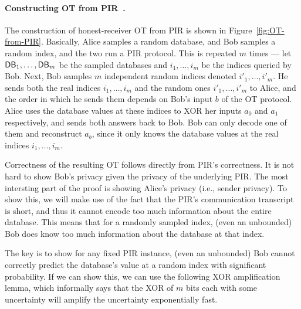 \paragraph{Constructing OT from PIR~\cite{CMO00}.}
The construction of honest-receiver OT from PIR is shown in Figure~\ref{fig:OT-from-PIR}.
Basically, Alice samples a random database, and Bob samples a random index,
and the two run a PIR protocol. This is repeated $m$ times 
--- let ${\sf DB}_1, \ldots, {\sf DB}_m$ be the sampled databases and $i_1, \ldots, i_m$ 
be the indices queried by Bob.
Next, Bob samples $m$ independent random indices denoted $i'_1, \ldots, i'_m$.
He sends both the real indices $i_1, \ldots, i_m$
and the random ones $i'_1, \ldots, i'_m$
to Alice, and the order in which 
he sends them depends on Bob's input $b$ of the OT protocol. 
Alice uses the database values at these indices
to XOR her inputs $a_0$ and $a_1$ respectively, and sends both answers back to Bob.
Bob can only decode one of them and reconstruct $a_b$, since it only
knows the database values at the real indices $i_1, \ldots, i_m$.


Correctness of the resulting OT follows directly
from PIR's correctness. 
It is not hard to show Bob's privacy given the privacy of the underlying PIR.
The most intersting 
part of the proof is showing Alice's privacy (i.e., sender privacy).
To show this, we will 
make use of the fact that the PIR's communication transcript
is short, and thus 
it cannot encode too much information about the entire database.
This means that for a randomly sampled
index, (even an unbounded) Bob does know too much information about the 
database at that index.

The key is to show for any fixed PIR instance, 
(even an unbounded) Bob cannot correctly 
predict the database's value 
at a random index with significant probability.
If we can show this, we can use the following XOR amplification lemma,
which informally says that the XOR of $m$ bits 
each with some uncertainty will amplify the uncertainty exponentially fast. 



